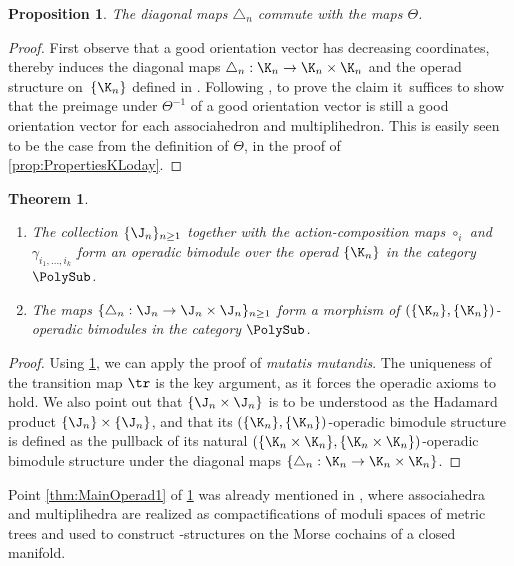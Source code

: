 \documentclass[JEP,XML,SOM,NoFloatCountersInSection,Unicode,published]{cedram}
\theoremstyle{definition}
\theoremstyle{plain}
\newtheorem{proposition}[definition]{Proposition}
\newtheorem{theorem}{Theorem}
\begin{document}
\begin{proposition}
\label{prop:thetacommutes}
The diagonal maps $\triangle_n$ commute with the maps $\Theta$.
\end{proposition}

\begin{proof}
First observe that a good orientation vector has decreasing coordinates, thereby induces the diagonal maps $\triangle_n : \K_n \to \K_n \times \K_n$ and the operad structure on~$\{\K_n\}$ defined in \cite{MTTV19}.
Following \cite[Prop.\,4.14]{LA21}, to prove the claim it~suffices to show that the preimage under $\Theta^{-1}$ of a good orientation vector is still a good orientation vector for each associahedron and multiplihedron.
This is easily seen to be the case from the definition of $\Theta$, in the proof of \cref{prop:PropertiesKLoday}.
\end{proof}

\skpt
\begin{theorem}\label{thm:MainOperad}
\begin{enumerate}
\item\label{thm:MainOperad1} The collection $\{\J_n\}_{n\geq 1}$ together with the action-composition maps $\circ_i$ and $\gamma_{i_1,\ldots,i_k}$ form an operadic bimodule over the operad $\{\K_n\}$ in the category $\PolySub$.

\item\label{thm:MainOperad2} The maps $\{\triangle_n : \J_n \to \J_n\times \J_n\}_{n\geq 1}$ form a morphism of $(\{\K_n\},\{\K_n\})$-operadic bimodules in the category $\PolySub$.
\end{enumerate}
\end{theorem}

\begin{proof}
Using \cref{prop:thetacommutes}, we can apply the proof of \cite[Th.\,1]{MTTV19} \emph{mutatis mutandis}. The uniqueness of the transition map $\tr$ is the key argument, as it forces the operadic axioms to hold. We also point out that $\{ \J_n\times \J_n \}$ is to be understood as the Hadamard product $\{ \J_n \} \times \{ \J_n \}$, and that its $(\{\K_n\},\{\K_n\})$-operadic bimodule structure is defined as the pullback of its natural $(\{\K_n \times \K_n\},\{\K_n \times \K_n\})$-operadic bimodule structure under the diagonal maps $\{ \triangle_n : \K_n \to \K_n \times \K_n \}$.
\end{proof}

Point \eqref{thm:MainOperad1} of \cref{thm:MainOperad} was already mentioned in \cite[\S 1.2]{mazuir-I}, where associahedra and multiplihedra are realized as compactifications of moduli spaces of metric trees and used to construct \Ainf-structures on the Morse cochains of a closed manifold.
\end{document}
